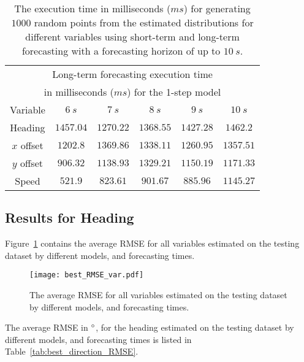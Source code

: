 \documentclass[preprint,12pt]{elsarticle}
\begin{document}
\begin{table}[!ht]
\begin{tabular}{|c|c|c|c|c|c|}
        \multicolumn{6}{|c|}{Long-term forecasting execution time} \\
        \multicolumn{6}{|c|}{in milliseconds ($ms$) for the 1-step model} \\ \hline
        Variable & $6 \ s$ & $7 \ s$ & $8 \ s$ & $9 \ s$ & $10 \ s$ \\ \hline
        Heading & $1457.04$ & $1270.22$ & $1368.55$ & $1427.28$ & $1462.2$ \\ \hline
        $x$ offset & $1202.8$ & $1369.86$ & $1338.11$ & $1260.95$ & $1357.51$ \\ \hline
        $y$ offset & $906.32$ & $1138.93$ & $1329.21$ & $1150.19$ & $1171.33$ \\ \hline
        Speed & $521.9$ & $823.61$ & $901.67$ & $885.96$ & $1145.27$ \\ \hline
    \end{tabular}
	\caption{The execution time in milliseconds ($ms$) for generating $1000$ random points from the estimated distributions for different variables using short-term and long-term forecasting with a forecasting horizon of up to $10 \ s$.}
	\label{tab:timeno}
\end{table}

\subsection{Results for Heading}

Figure~\ref{fig:best_RMSE_var} contains the average RMSE for all variables estimated on the testing dataset by different models, and forecasting times.

\begin{figure}[!ht]
	\centering
	\texttt{[image: best\_RMSE\_var.pdf]}
	\caption{The average RMSE for all variables estimated on the testing dataset by different models, and forecasting times.}
	\label{fig:best_RMSE_var}
\end{figure}

The average RMSE in $\degree$, for the heading estimated on the testing dataset by different models, and forecasting times is listed in Table~\ref{tab:best_direction_RMSE}.
\end{document}
